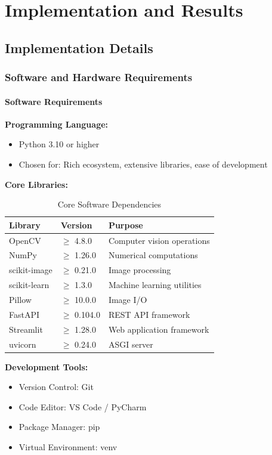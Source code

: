 \chapter{Implementation and Results}

\section{Implementation Details}

\subsection{Software and Hardware Requirements}

\subsubsection{Software Requirements}

\textbf{Programming Language:}
\begin{itemize}
    \item Python 3.10 or higher
    \item Chosen for: Rich ecosystem, extensive libraries, ease of development
\end{itemize}

\textbf{Core Libraries:}
\begin{table}[h]
\centering
\begin{tabular}{|l|l|l|}
\hline
\textbf{Library} & \textbf{Version} & \textbf{Purpose} \\
\hline
OpenCV & $\geq$ 4.8.0 & Computer vision operations \\
NumPy & $\geq$ 1.26.0 & Numerical computations \\
scikit-image & $\geq$ 0.21.0 & Image processing \\
scikit-learn & $\geq$ 1.3.0 & Machine learning utilities \\
Pillow & $\geq$ 10.0.0 & Image I/O \\
FastAPI & $\geq$ 0.104.0 & REST API framework \\
Streamlit & $\geq$ 1.28.0 & Web application framework \\
uvicorn & $\geq$ 0.24.0 & ASGI server \\
\hline
\end{tabular}
\caption{Core Software Dependencies}
\end{table}

\textbf{Development Tools:}
\begin{itemize}
    \item Version Control: Git
    \item Code Editor: VS Code / PyCharm
    \item Package Manager: pip
    \item Virtual Environment: venv
\end{itemize}

